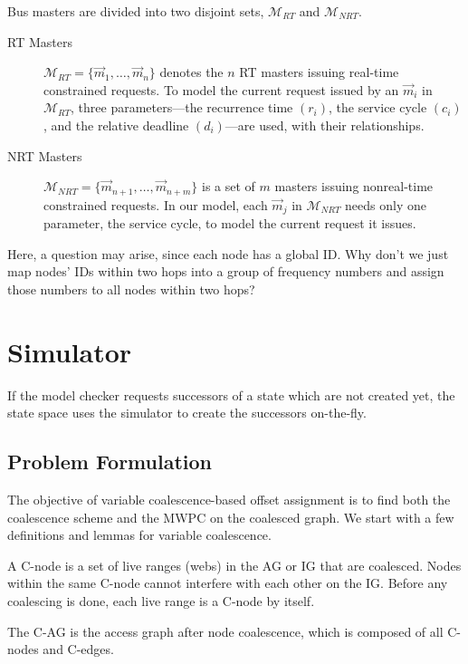 \documentclass[prodmode,acmtecs]{acmsmall}
\begin{document}
Bus masters are divided into two disjoint sets, $\mathcal{M}_{RT}$
and $\mathcal{M}_{NRT}$.
\begin{description}
\item[RT Masters]
$\mathcal{M}_{RT}=\{ \vec{m}_{1},\dots,\vec{m}_{n}\}$ denotes the
$n$ RT masters issuing real-time constrained requests. To model the
current request issued by an $\vec{m}_{i}$ in $\mathcal{M}_{RT}$,
three parameters---the recurrence time $(r_i)$, the service cycle
$(c_i)$, and the relative deadline $(d_i)$---are used, with their
relationships.
\item[NRT Masters]
$\mathcal{M}_{NRT}=\{ \vec{m}_{n+1},\dots,\vec{m}_{n+m}\}$ is a set
of $m$ masters issuing nonreal-time constrained requests. In our
model, each $\vec{m}_{j}$ in $\mathcal{M}_{NRT}$ needs only one
parameter, the service cycle, to model the current request it
issues.
\end{description}

Here, a question may arise, since each node has a global ID. Why
don't we just map nodes' IDs within two hops into a group of
frequency numbers and assign those numbers to all nodes within two
hops?

\section{Simulator}
\label{sec:sim}

If the model checker requests successors of a state which are not
created yet, the state space uses the simulator to create the
successors on-the-fly.

\subsection{Problem Formulation}

The objective of variable coalescence-based offset assignment is to find
both the coalescence scheme and the MWPC on the coalesced graph. We start
with a few definitions and lemmas for variable coalescence.

\begin{definition}A C-node is a set of
live ranges (webs) in the AG or IG that are coalesced. Nodes within the same
C-node cannot interfere with each other on the IG. Before any coalescing is
done, each live range is a C-node by itself.
\end{definition}

\begin{definition}The C-AG is the access
graph after node coalescence, which is composed of all C-nodes and C-edges.
\end{definition}
\end{document}

